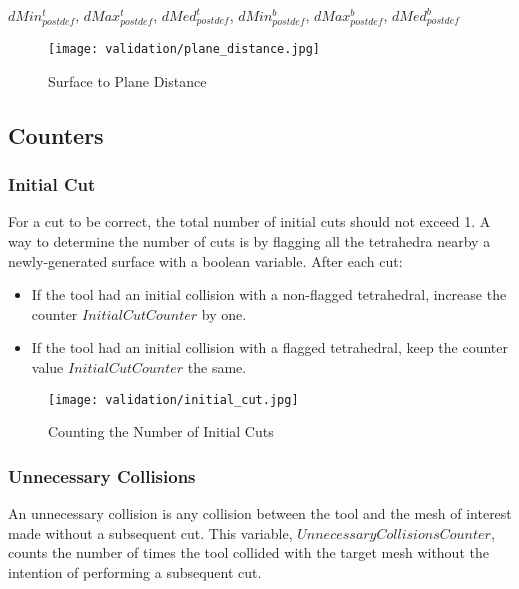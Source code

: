 \hfill

$dMin_{postdef}^t$, $dMax_{postdef}^t$, $dMed_{postdef}^t$, $dMin_{postdef}^b$, $dMax_{postdef}^b$, $dMed_{postdef}^b$

\begin{figure}
  \centering%
  \texttt{[image: validation/plane\_distance.jpg]}
  \caption{Surface to Plane Distance}\label{fig:surface_to_plane_distance}
\end{figure}

\subsection{Counters}\label{para:data_counters}

\subsubsection{Initial Cut}\label{para:data_counters_initial_cut}

For a cut to be correct, the total number of initial cuts should not exceed 1. A way to determine the number of cuts is by flagging all the tetrahedra nearby a newly-generated surface with a boolean variable. After each cut:

\begin{itemize}
\item If the tool had an initial collision with a non-flagged tetrahedral, increase the counter $InitialCutCounter$ by one.
\item If the tool had an initial collision with a flagged tetrahedral, keep the counter value $InitialCutCounter$ the same.
\end{itemize}

\begin{figure}
  \centering%
  \texttt{[image: validation/initial\_cut.jpg]}
  \caption{Counting the Number of Initial Cuts}
  \label{fig:ideal_cut}
\end{figure}


\subsubsection{Unnecessary Collisions}
\label{para:data_counters_unnecessary_collisions}

An unnecessary collision is any collision between the tool and the mesh of interest made without a subsequent cut. This variable, $UnnecessaryCollisionsCounter$, counts the number of times the tool collided with the target mesh without the intention of performing a subsequent cut.


